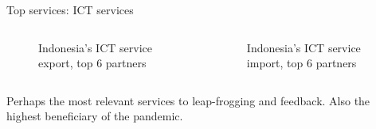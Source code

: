 \documentclass[
  ignorenonframetext,
]{beamer}
\begin{document}
\begin{frame}{Top services: ICT services}
\label{top-services-ict-services}
\begin{columns}[T]
\begin{column}{0.47\textwidth}
\begin{figure}


\caption{\label{fig-SX}Indonesia's ICT service export, top 6 partners}

\end{figure}%
\end{column}

\begin{column}{0.47\textwidth}
\begin{figure}


\caption{\label{fig-SM}Indonesia's ICT service import, top 6 partners}

\end{figure}%
\end{column}
\end{columns}

Perhaps the most relevant services to leap-frogging and feedback. Also
the highest beneficiary of the pandemic.
\end{frame}
\end{document}
